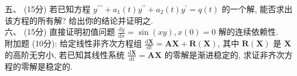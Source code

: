 \documentclass[UTF8]{ctexart}
\begin{document}
五、 (15分) 若已知方程 $y^{\prime\prime\prime}+a_1(t)y^{\prime\prime}+a_2(t)y^{\prime}=q(t)$ 的一个解, 能否求出该方程的所有解? 给出你的结论并证明之.
\\

六、 (15分) 直接证明初值问题 $\displaystyle\frac{\text{d}y}{\text{d}x}=\sin(xy), x(0)=0$ 解的连续依赖性.
\\

附加题 (10分): 给定线性非齐次方程组 $\displaystyle\frac{\text{d}\boldsymbol{X}}{\text{d}t}=\boldsymbol{AX}+\boldsymbol{R}\left( \boldsymbol{X} \right)$, 其中 $\boldsymbol{R}\left( \boldsymbol{X} \right)$ 是 $\boldsymbol{X}$ 的高阶无穷小, 若已知其线性系统 $\displaystyle\frac{\text{d}\boldsymbol{X}} {\text{d}t}=\boldsymbol{AX}$ 的零解是渐进稳定的, 求证非齐次方程的零解是稳定的.
\end{document}
